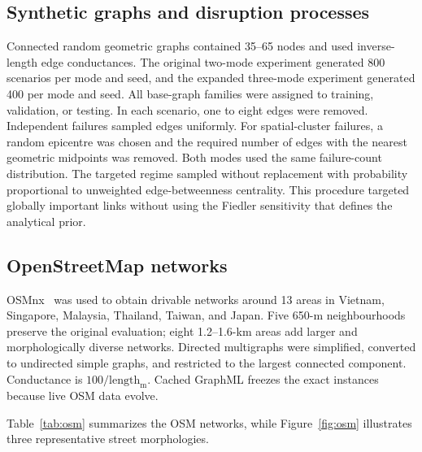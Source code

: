 \documentclass[11pt]{article}
\begin{document}
\subsection{Synthetic graphs and disruption processes}
Connected random geometric graphs contained 35--65 nodes and used inverse-length edge
conductances. The original two-mode experiment generated 800 scenarios per mode
and seed, and the expanded three-mode experiment generated 400 per mode and seed.
All base-graph families were assigned to training, validation, or testing. In each
scenario, one to eight edges were removed. Independent failures sampled edges uniformly.
For spatial-cluster failures, a random epicentre was chosen and the required
number of edges with the nearest geometric midpoints was removed. Both modes used the same
failure-count distribution.
The targeted regime sampled without replacement with probability proportional to
unweighted edge-betweenness centrality. This procedure targeted globally important links
without using the Fiedler sensitivity that defines the analytical prior.

\subsection{OpenStreetMap networks}
OSMnx~\cite{boeing2017} was used to obtain drivable networks around 13 areas in
Vietnam, Singapore, Malaysia, Thailand, Taiwan, and Japan. Five 650-m
neighbourhoods preserve the original evaluation; eight 1.2--1.6-km areas add
larger and morphologically diverse networks. Directed multigraphs were simplified, converted to undirected
simple graphs, and restricted to the largest connected component. Conductance
is $100/\mathrm{length}_{\mathrm m}$. Cached GraphML freezes the exact instances
because live OSM data evolve.

Table~\ref{tab:osm} summarizes the OSM networks, while
Figure~\ref{fig:osm} illustrates three representative street morphologies.
\end{document}
